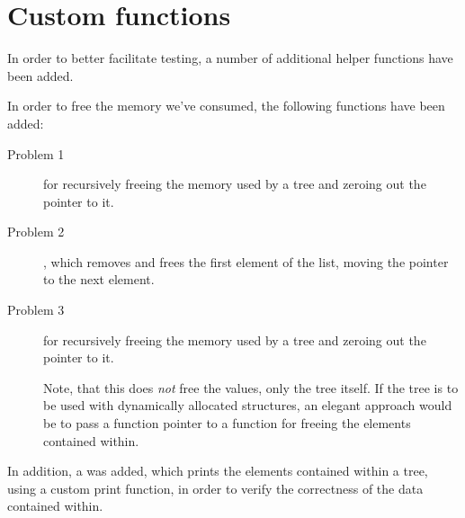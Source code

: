 \section{Custom functions}

In order to better facilitate testing, a number of additional helper functions
have been added.

In order to free the memory we've consumed, the following functions have been
added:
\begin{description}
    \item[Problem 1] {
         for recursively freeing the memory used by a tree
        and zeroing out the pointer to it.
    }
    \item[Problem 2] {
        , which removes and frees the first element of
        the list, moving the pointer to the next element.
    }
    \item[Problem 3] {
         for recursively freeing the memory used by a tree
        and zeroing out the pointer to it.

        Note, that this does \emph{not} free the values, only the tree itself.
        If the tree is to be used with dynamically allocated structures, an
        elegant approach would be to pass a function pointer to a function
        for freeing the elements contained within.
    }
\end{description}

In addition, a  was added, which prints the elements
contained within a tree, using a custom print function, in order to verify
the correctness of the data contained within.
